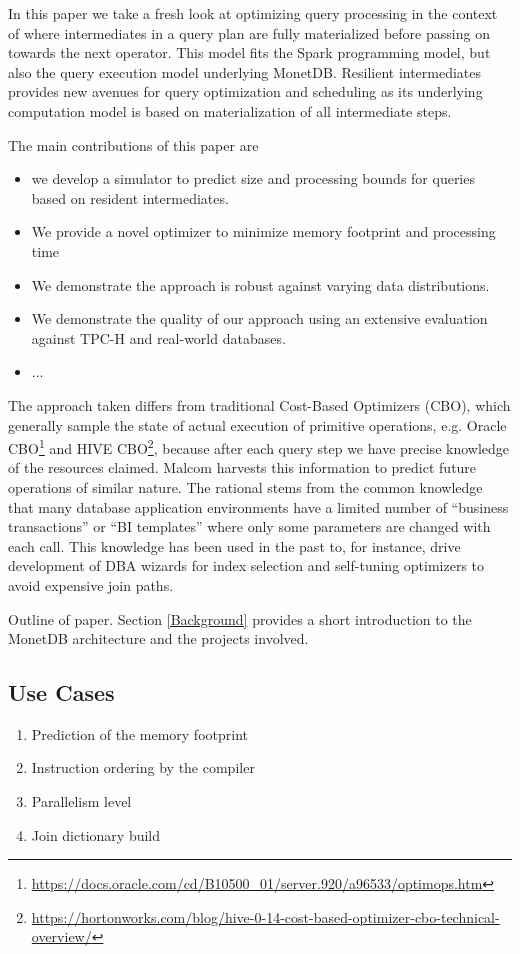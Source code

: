 In this paper we take a fresh look at optimizing query processing in the context
of where intermediates in a query plan are fully materialized before passing on
towards the next operator. This model fits the Spark programming model,
but also the query execution model underlying MonetDB.
Resilient intermediates provides new avenues for query optimization and
scheduling as its underlying computation model is based on
materialization of all intermediate steps.

The main contributions of this paper are
\begin{itemize}
	\item we develop a simulator to predict size and processing bounds for queries based on resident intermediates.
	\item We provide a novel optimizer to minimize memory footprint and processing time
	\item We demonstrate the approach is robust against varying data distributions.
	\item We demonstrate the quality of our approach using an extensive evaluation against TPC-H and real-world databases.
	\item ...
\end{itemize}

The approach taken differs from traditional Cost-Based Optimizers (CBO), which generally sample the state of actual execution of primitive operations, e.g. Oracle CBO\footnote{\url{https://docs.oracle.com/cd/B10500_01/server.920/a96533/optimops.htm}} and HIVE CBO\footnote{\url{https://hortonworks.com/blog/hive-0-14-cost-based-optimizer-cbo-technical-overview/}}, because after each query step we have precise knowledge of the resources claimed.
Malcom harvests this information to predict future operations of similar nature.
The rational stems from the common knowledge that many database application
environments have a limited number of ``business transactions'' or ``BI templates'' where only some parameters are changed with each call.
This knowledge has been used in the past to, for instance, drive development of DBA wizards \cite{microsoft} for index selection and self-tuning optimizers
\cite{IBM} to avoid expensive join paths.

Outline of paper. Section \ref{Background} provides a short introduction
to the MonetDB architecture and the projects involved.

\subsection{Use Cases}
\begin{enumerate}
  \item Prediction of the memory footprint
  \item Instruction ordering by the compiler
  \item Parallelism level
  \item Join dictionary build
\end{enumerate}
